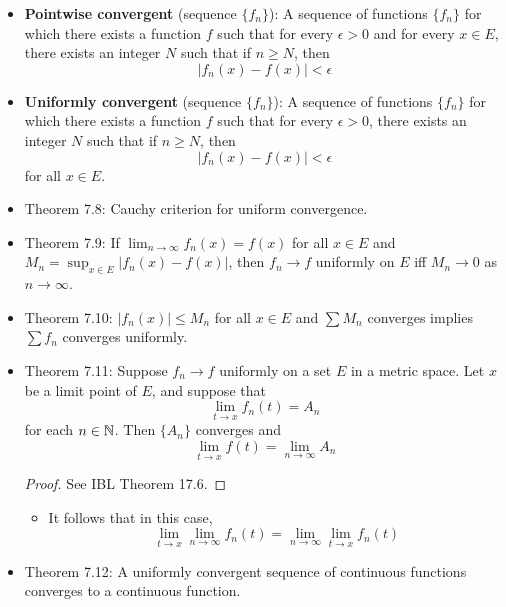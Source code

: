 \documentclass[../../notes.tex]{subfiles}
\begin{document}
\begin{itemize}
    \item \textbf{Pointwise convergent} (sequence $\{f_n\}$): A sequence of functions $\{f_n\}$ for which there exists a function $f$ such that for every $\epsilon>0$ and for every $x\in E$, there exists an integer $N$ such that if $n\geq N$, then
    \begin{equation*}
        |f_n(x)-f(x)| < \epsilon
    \end{equation*}
    \item \textbf{Uniformly convergent} (sequence $\{f_n\}$): A sequence of functions $\{f_n\}$ for which there exists a function $f$ such that for every $\epsilon>0$, there exists an integer $N$ such that if $n\geq N$, then
    \begin{equation*}
        |f_n(x)-f(x)| < \epsilon
    \end{equation*}
    for all $x\in E$.
    \item Theorem 7.8: Cauchy criterion for uniform convergence.
    \item Theorem 7.9: If $\lim_{n\to\infty}f_n(x)=f(x)$ for all $x\in E$ and $M_n=\sup_{x\in E}|f_n(x)-f(x)|$, then $f_n\to f$ uniformly on $E$ iff $M_n\to 0$ as $n\to\infty$.
    \item Theorem 7.10: $|f_n(x)|\leq M_n$ for all $x\in E$ and $\sum M_n$ converges implies $\sum f_n$ converges uniformly.
    \item Theorem 7.11: Suppose $f_n\to f$ uniformly on a set $E$ in a metric space. Let $x$ be a limit point of $E$, and suppose that
    \begin{equation*}
        \lim_{t\to x}f_n(t) = A_n
    \end{equation*}
    for each $n\in\mathbb{N}$. Then $\{A_n\}$ converges and
    \begin{equation*}
        \lim_{t\to x}f(t) = \lim_{n\to\infty}A_n
    \end{equation*}
    \begin{proof}
        See IBL Theorem 17.6.
    \end{proof}
    \begin{itemize}
        \item It follows that in this case,
        \begin{equation*}
            \lim_{t\to x}\lim_{n\to\infty}f_n(t) = \lim_{n\to\infty}\lim_{t\to x}f_n(t)
        \end{equation*}
    \end{itemize}
    \item Theorem 7.12: A uniformly convergent sequence of continuous functions converges to a continuous function.

\end{itemize}
\end{document}
